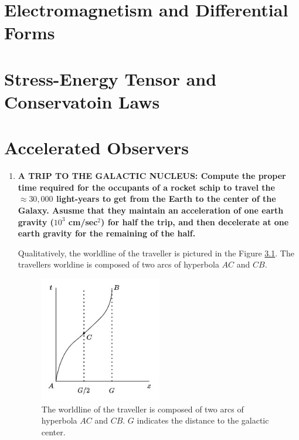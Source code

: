 \documentclass[9pt]{report}
\begin{document}
\chapter{Electromagnetism and Differential Forms}
\chapter{Stress-Energy Tensor and Conservatoin Laws}
\chapter{Accelerated Observers}
\begin{enumerate}
\item \textbf{A TRIP TO THE GALACTIC NUCLEUS: Compute the proper time required
for the occupants of a rocket schip to travel the $\approx 30,000$ light-years
to get from the Earth to the center of the Galaxy. Asusme that they maintain
an acceleration of one earth gravity ($10^3$ cm/sec$^2$) for half the trip,
and then decelerate at one earth gravity for the remaining of the half.}

Qualitatively, the worldline of the traveller is pictured in the Figure \ref{galactic_center}.
The travellers worldine is composed of two arcs of hyperbola $AC$ and $CB$.
\begin{figure}
  \begin{center}
  \includegraphics[width=0.50\textwidth]{images/galactic_center_minkowski.jpg}
  \end{center}
  \caption{The worldline of the traveller is composed of two arcs of hyperbola
  $AC$ and $CB$. $G$ indicates the distance to the galactic center.}
  \label{galactic_center}
\end{figure}


\end{enumerate}
\end{document}
